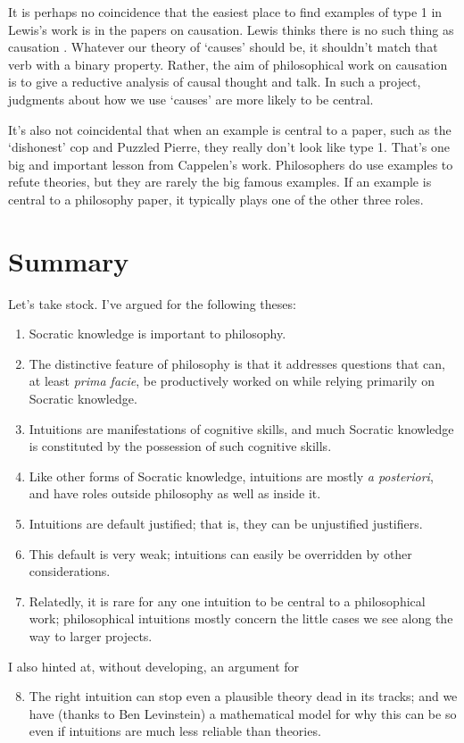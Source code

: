 It is perhaps no coincidence that the easiest place to find examples of type 1 in Lewis's work is in the papers on causation. Lewis thinks there is no such thing as causation \citep{Lewis2004a, Lewis2004d}. Whatever our theory of `causes' should be, it shouldn't match that verb with a binary property. Rather, the aim of philosophical work on causation is to give a reductive analysis of causal thought and talk. In such a project, judgments about how we use `causes' are more likely to be central.

It's also not coincidental that when an example is central to a paper, such as the `dishonest' cop and Puzzled Pierre, they really don't look like type 1. That's one big and important lesson from Cappelen's work. Philosophers do use examples to refute theories, but they are rarely the big famous examples. If an example is central to a philosophy paper, it typically plays one of the other three roles.

\section{Summary}
\label{sec:Summary}
Let's take stock. I've argued for the following theses:

\begin{enumerate}
\item Socratic knowledge is important to philosophy.
\item The distinctive feature of philosophy is that it addresses questions that can, at least \textit{prima facie}, be productively worked on while relying primarily on Socratic knowledge.
\item Intuitions are manifestations of cognitive skills, and much Socratic knowledge is constituted by the possession of such cognitive skills.
\item \label{thesis:apost} Like other forms of Socratic knowledge, intuitions are mostly \textit{a posteriori}, and have roles outside philosophy as well as inside it.
\item Intuitions are default justified; that is, they can be unjustified justifiers.
\item This default is very weak; intuitions can easily be overridden by other considerations.
\item \label{thesis:little} Relatedly, it is rare for any one intuition to be central to a philosophical work; philosophical intuitions mostly concern the little cases we see along the way to larger projects.
\end{enumerate}
\noindent I also hinted at, without developing, an argument for 
\begin{enumerate}
\setcounter{enumi}{7}
\item The right intuition can stop even a plausible theory dead in its tracks; and we have (thanks to Ben Levinstein) a mathematical model for why this can be so even if intuitions are much less reliable than theories.
\end{enumerate}

